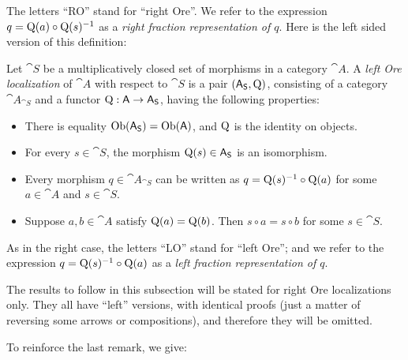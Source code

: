 The letters ``RO'' stand for ``right Ore''. 
We refer to the expression 
$q = \operatorname{Q}(a) \circ \operatorname{Q}(s)^{-1}$
as a {\em right fraction representation of $q$}. 
Here is the left sided version of this definition: 

\begin{dfn}  \label{dfn:2310}  
Let $\cat{S}$ be a multiplicatively closed set of morphisms in a category 
$\cat{A}$. A {\em left Ore localization}
of $\cat{A}$ with respect to 
$\cat{S}$ is a pair $(\operatorname{\mathsf{A}}_{\operatorname{\mathsf{S}}}, \operatorname{Q})$, consisting of a category 
$\cat{A}_{\cat{S}}$ and a functor 
$\operatorname{Q} : \operatorname{\mathsf{A}} \to \operatorname{\mathsf{A}}_{\operatorname{\mathsf{S}}}$,
having the following properties:
\begin{itemize}[leftmargin=30pt] 
\item[(LO1)] There is equality 
$\operatorname{Ob}(\operatorname{\mathsf{A}}_{\operatorname{\mathsf{S}}}) = \operatorname{Ob}(\operatorname{\mathsf{A}})$, and $\operatorname{Q}$ is the 
identity on
objects.

\item[(LO2)]  For every $s \in \cat{S}$, the morphism $\operatorname{Q}(s) \in
\operatorname{\mathsf{A}}_{\operatorname{\mathsf{S}}}$
is an isomorphism. 

\item[(LO3)]  Every morphism $q \in \cat{A}_{\cat{S}}$ can be written as
$q = \operatorname{Q}(s)^{-1} \circ \operatorname{Q}(a)$ for some 
$a \in \cat{A}$ and $s \in \cat{S}$.

\item[(LO4)]  Suppose $a, b \in \cat{A}$ satisfy 
$\operatorname{Q}(a) = \operatorname{Q}(b)$. Then $s \circ a = s \circ b$
for some $s \in \cat{S}$. 
\end{itemize}
\end{dfn}

As in the right case, the letters ``LO'' stand for ``left Ore''; and we refer 
to the expression 
$q = \operatorname{Q}(s)^{-1} \circ \operatorname{Q}(a)$
as a {\em left fraction representation of $q$}. 

\begin{rem} \label{rem:1845}
The results to follow in this subsection will be stated for right Ore 
localizations only. They all have ``left'' versions, with identical proofs 
(just a matter of reversing some arrows or compositions),  and therefore they 
will be omitted. 
\end{rem}

To reinforce the last remark, we give: 


